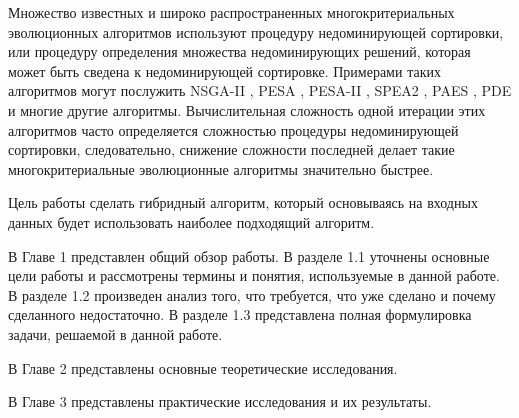 \startprefacepage

Множество известных и широко распространенных многокритериальных эволюционных алгоритмов используют процедуру недоминирующей сортировки, или процедуру определения множества недоминирующих решений, которая может быть сведена к недоминирующей сортировке. Примерами таких алгоритмов могут послужить NSGA-II \cite{NSGA-II}, PESA \cite{PESA}, PESA-II \cite{PESA-II}, SPEA2 \cite{SPEA2}, PAES \cite{PAES}, PDE \cite{PDE} и многие другие алгоритмы. Вычислительная сложность одной итерации этих алгоритмов часто определяется сложностью процедуры недоминирующей сортировки, следовательно, снижение сложности последней делает такие многокритериальные эволюционные алгоритмы значительно быстрее.

Цель работы сделать гибридный алгоритм, который основываясь на входных данных будет использовать наиболее подходящий алгоритм.

В Главе 1 представлен общий обзор работы. В разделе 1.1 уточнены основные цели работы и рассмотрены термины и понятия, используемые в данной работе. В разделе 1.2 произведен анализ того, что требуется, что уже сделано и почему сделанного недостаточно. В разделе 1.3 представлена полная формулировка задачи, решаемой в данной работе.

В Главе 2 представлены основные теоретические исследования. 

В Главе 3 представлены практические исследования и их результаты.



